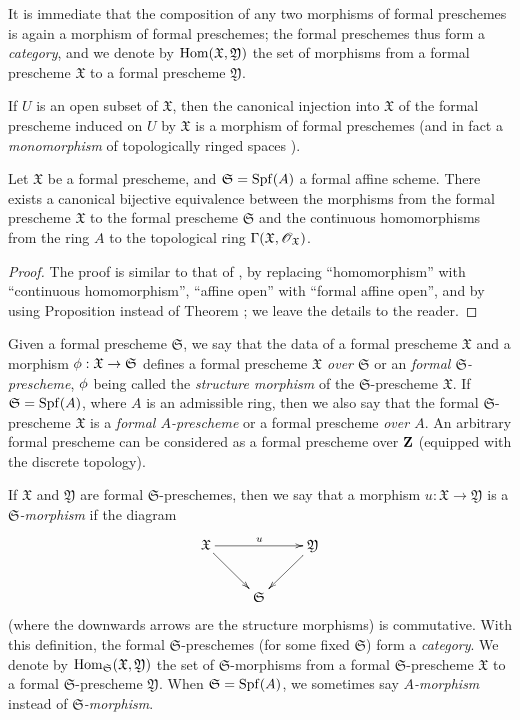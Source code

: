 It is immediate that the composition of any two morphisms of formal preschemes is again a morphism of formal preschemes; the formal preschemes thus form a \emph{category}, and we denote by $\operatorname{Hom}(\mathfrak{X},\mathfrak{Y})$ the set of morphisms from a formal prescheme $\mathfrak{X}$ to a formal prescheme $\mathfrak{Y}$.

If $U$ is an open subset of $\mathfrak{X}$, then the canonical injection into $\mathfrak{X}$ of the formal prescheme induced on $U$ by $\mathfrak{X}$ is a morphism of formal preschemes (and in fact a \emph{monomorphism} of topologically ringed spaces ).

\begin{proposition}[10.4.6]
\label{I.10.4.6}
Let $\mathfrak{X}$ be a formal prescheme, and $\mathfrak{S}=\operatorname{Spf}(A)$ a formal affine scheme.
There exists a canonical bijective equivalence between the morphisms from the formal prescheme $\mathfrak{X}$ to the formal prescheme $\mathfrak{S}$ and the continuous homomorphisms from the ring $A$ to the topological ring $\Gamma(\mathfrak{X},\mathscr{O}_\mathfrak{X})$.
\end{proposition}

\begin{proof}
The proof is similar to that of , by replacing ``homomorphism'' with ``continuous homomorphism'', ``affine open'' with ``formal affine open'', and by using Proposition  instead of Theorem ; we leave the details to the reader.
\end{proof}

\begin{env}[10.4.7]
\label{I.10.4.7}
Given a formal prescheme $\mathfrak{S}$, we say that the data of a formal prescheme $\mathfrak{X}$ and a morphism $\vphi:\mathfrak{X}\to\mathfrak{S}$ defines a formal prescheme \emph{$\mathfrak{X}$ over $\mathfrak{S}$} or an \emph{formal $\mathfrak{S}$-prescheme}, $\phi$ being called the \emph{structure morphism} of the $\mathfrak{S}$-prescheme $\mathfrak{X}$.
If $\mathfrak{S}=\operatorname{Spf}(A)$, where $A$ is an admissible ring, then we also say that the formal $\mathfrak{S}$-prescheme $\mathfrak{X}$ is a \emph{formal $A$-prescheme} or a formal prescheme \emph{over $A$}.
An arbitrary formal prescheme can be considered as a formal prescheme over $\mathbf{Z}$ (equipped with the discrete topology).

If $\mathfrak{X}$ and $\mathfrak{Y}$ are formal $\mathfrak{S}$-preschemes, then we say that a morphism $u:\mathfrak{X}\to\mathfrak{Y}$ is a \emph{$\mathfrak{S}$-morphism} if the diagram
\[
  \xymatrix{
    \mathfrak{X}\ar[rr]^u\ar[rd] & &
    \mathfrak{Y}\ar[ld]\\
    & \mathfrak{S}
  }
\]
(where the downwards arrows are the structure morphisms) is commutative.
With this definition, the formal $\mathfrak{S}$-preschemes (for some fixed $\mathfrak{S}$) form a \emph{category}.
We denote by $\operatorname{Hom}_\mathfrak{S}(\mathfrak{X},\mathfrak{Y})$ the set of $\mathfrak{S}$-morphisms from a formal $\mathfrak{S}$-prescheme $\mathfrak{X}$ to a formal $\mathfrak{S}$-prescheme $\mathfrak{Y}$.
When $\mathfrak{S}=\operatorname{Spf}(A)$, we sometimes say \emph{$A$-morphism} instead of \emph{$\mathfrak{S}$-morphism}.
\end{env}

